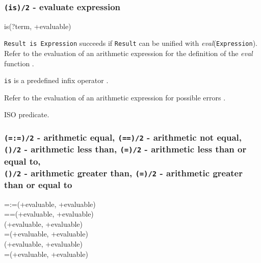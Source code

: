 \subsubsection{\texttt{(is)/2} - evaluate expression}

\begin{TemplatesOneCol}
is(?term, +evaluable)

\end{TemplatesOneCol}

\Description

\texttt{Result is Expression} succeeds if \texttt{Result} can be
unified with \textit{eval}(\texttt{Expression}). Refer to the
evaluation of an arithmetic expression for the definition of the
\textit{eval} function
.

\texttt{is} is a predefined infix operator .

\Errors

Refer to the evaluation of an arithmetic expression for possible errors
.

\Portability

ISO predicate.

\subsubsection{\texttt{(=:=)/2} - arithmetic equal,
               \texttt{(={\bs}=)/2} - arithmetic not equal, \\
               \texttt{({\lt})/2} - arithmetic less than,
               \texttt{(={\lt})/2} - arithmetic less than or equal to, \\
               \texttt{({\gt})/2} - arithmetic greater than,
               \texttt{({\gt}=)/2} - arithmetic greater than or equal to}
\label{(=:=)/2} 

\begin{TemplatesTwoCols}
=:=(+evaluable, +evaluable)\\
={\bs}=(+evaluable, +evaluable)\\
{\lt}(+evaluable, +evaluable)\\
={\lt}(+evaluable, +evaluable)\\
{\gt}(+evaluable, +evaluable)\\
{\gt}=(+evaluable, +evaluable)

\end{TemplatesTwoCols}


